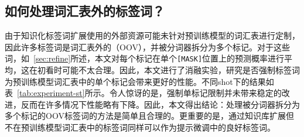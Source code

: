 \begin{table}[!htbp]
\caption{限制扩展标签词为预训练模型词汇表中的单个标记的结果，其中ST表示“单个标记”。绿色上箭头\gd 表示结果高于表~\ref{tab:experiment-few-shot}中的KPT，红色下箭头\bd 表示结果低于表~\ref{tab:experiment-few-shot}中的KPT。}
\begin{center}
\end{center}
\label{tab:experiment-st}
\end{table}

\subsection{如何处理词汇表外的标签词？}
\label{app:experiment-st}
由于知识化标签词扩展使用的外部资源可能未针对预训练模型的词汇表进行定制，因此许多标签词是词汇表外的（OOV），并被分词器拆分为多个标记。对于这些词，如~\ref{sec:refine}所述，本文对每个标记在单个\texttt{[MASK]}位置上的预测概率进行平均，这在初看时可能不太合理。因此，本文进行了消融实验，研究是否强制标签词为预训练模型词汇表中的单个标记会带来更好的性能。不同shot下的结果如表~\ref{tab:experiment-st}所示。令人惊讶的是，强制单标记限制并未带来稳定的改进，反而在许多情况下性能略有下降。因此，本文得出结论：处理被分词器拆分为多个标记的OOV标签词的方法是简单且合理的。更重要的是，通过知识库扩展但不在预训练模型词汇表中的标签词同样可以作为提示微调中的良好标签词。

